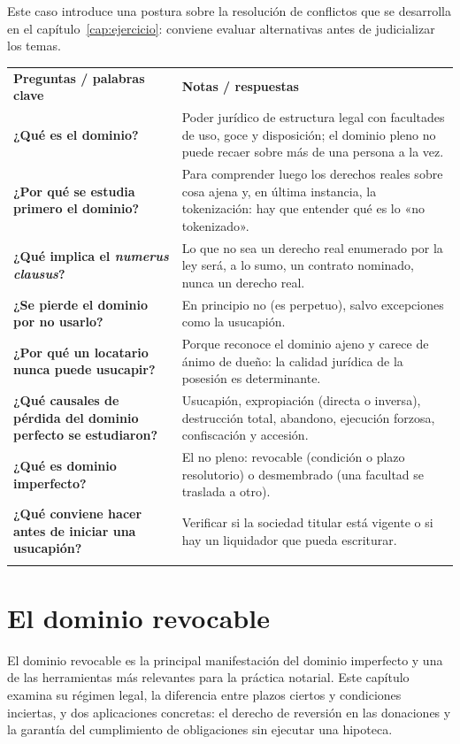 \documentclass[12pt,oneside]{book}
\newcommand{\cq}[1]{\textbf{#1}}
\newcommand{\cornell}[3]{%
  \par\medskip\noindent\begingroup
  \renewcommand{\arraystretch}{1.25}%
  \begin{tabularx}{\textwidth}{|>{\raggedright\arraybackslash}p{0.27\textwidth}|>{\raggedright\arraybackslash}X|}
    \hline
    \multicolumn{2}{|>{\centering\arraybackslash}X|}{\cellcolor{azulacad!12}\textbf{Cuadro Cornell --- #1}}\\ \hline
    \cellcolor{gray!10}\textbf{Preguntas / palabras clave} & \cellcolor{gray!10}\textbf{Notas / respuestas} \\ \hline
    #2
    \multicolumn{2}{|>{\raggedright\arraybackslash}X|}{\cellcolor{azulacad!6}\textbf{Resumen.} #3}\\ \hline
  \end{tabularx}%
  \endgroup\par\medskip}
\begin{document}
Este caso introduce una postura sobre la resolución de conflictos que se desarrolla en el capítulo~\ref{cap:ejercicio}: conviene evaluar alternativas antes de judicializar los temas.

\cornell{El dominio y sus límites}{
\cq{¿Qué es el dominio?} & Poder jurídico de estructura legal con facultades de uso, goce y disposición; el dominio pleno no puede recaer sobre más de una persona a la vez. \\ \hline
\cq{¿Por qué se estudia primero el dominio?} & Para comprender luego los derechos reales sobre cosa ajena y, en última instancia, la tokenización: hay que entender qué es lo «no tokenizado». \\ \hline
\cq{¿Qué implica el \emph{numerus clausus}?} & Lo que no sea un derecho real enumerado por la ley será, a lo sumo, un contrato nominado, nunca un derecho real. \\ \hline
\cq{¿Se pierde el dominio por no usarlo?} & En principio no (es perpetuo), salvo excepciones como la usucapión. \\ \hline
\cq{¿Por qué un locatario nunca puede usucapir?} & Porque reconoce el dominio ajeno y carece de ánimo de dueño: la calidad jurídica de la posesión es determinante. \\ \hline
\cq{¿Qué causales de pérdida del dominio perfecto se estudiaron?} & Usucapión, expropiación (directa o inversa), destrucción total, abandono, ejecución forzosa, confiscación y accesión. \\ \hline
\cq{¿Qué es dominio imperfecto?} & El no pleno: revocable (condición o plazo resolutorio) o desmembrado (una facultad se traslada a otro). \\ \hline
\cq{¿Qué conviene hacer antes de iniciar una usucapión?} & Verificar si la sociedad titular está vigente o si hay un liquidador que pueda escriturar. \\ \hline
}{El dominio se presenta como el derecho real más fuerte, pero admite excepciones y modalidades. Antes de resolver conviene encuadrar el problema y explorar vías más rápidas que el juicio; el dominio imperfecto (revocable o desmembrado) abre el camino a herramientas prácticas.}

\chapter{El dominio revocable}
\label{cap:revocable}

El dominio revocable es la principal manifestación del dominio imperfecto y una de las herramientas más relevantes para la práctica notarial. Este capítulo examina su régimen legal, la diferencia entre plazos ciertos y condiciones inciertas, y dos aplicaciones concretas: el derecho de reversión en las donaciones y la garantía del cumplimiento de obligaciones sin ejecutar una hipoteca.
\end{document}
